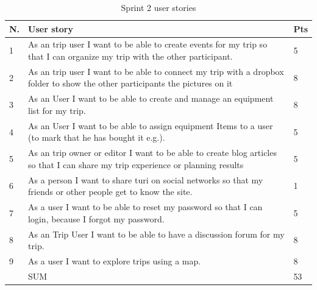 \documentclass[a4paper]{article}
\begin{document}
\begin{table}[!h]
  \centering
  \begin{tabulary}{1.0\textwidth}{|L|L|L|}
    \hline
    N. & User story & Pts \\ \hline

    1&As an trip user I want to be able to create events for my trip so that I can organize my trip with the other participant.
    & 5 \\ \hline

    2&As an trip user I want to be able to connect my trip with a dropbox folder to show the other participants the pictures on it
    & 8 \\ \hline

    3 &As an User I want to be able to create and manage an equipment list for my trip. 
    & 8 \\ \hline

    4 & As an User I want to be able to assign equipment Items to a user (to mark that he has bought it e.g.).
    & 5 \\ \hline

    5& As an trip owner or editor I want to be able to create blog articles so that I can share my trip experience or planning results
    & 5 \\ \hline

    6& As a person I want to share turi on social networks so that my friends or other people get to know the site.
    & 1 \\ \hline

    7& As a user I want to be able to reset my password so that I can login, because I forgot my password.
    &5 \\ \hline

    8& As an Trip User I want to be able to have a discussion forum for my trip.
    & 8 \\ \hline

    9& As a user I want to explore trips using a map.
    & 8 \\ \hline

    &SUM&53 \\ \hline

    
  \end{tabulary}
  \caption{Sprint 2 user stories}
\label{tab:sprint2}
\end{table}
\end{document}
